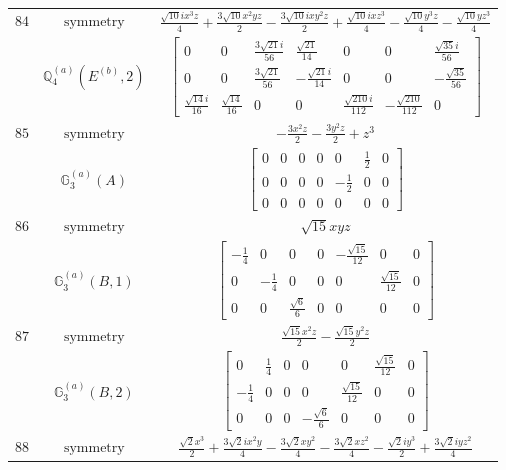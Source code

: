 \documentclass[fleqn,8pt,landscape]{jsarticle}
\begin{document}
\begin{longtable}{ccc}
$ 84 $ & $ \text{symmetry} $ & $ \frac{\sqrt{10} i x^{3} z}{4} + \frac{3 \sqrt{10} x^{2} y z}{2} - \frac{3 \sqrt{10} i x y^{2} z}{2} + \frac{\sqrt{10} i x z^{3}}{4} - \frac{\sqrt{10} y^{3} z}{4} - \frac{\sqrt{10} y z^{3}}{4} $ \\
$  $ & $ \mathbb{Q}_{4}^{(a)}(E^{(b)},2) $ & $ \begin{bmatrix} 0 & 0 & \frac{3 \sqrt{21} i}{56} & \frac{\sqrt{21}}{14} & 0 & 0 & \frac{\sqrt{35} i}{56} \\ 0 & 0 & \frac{3 \sqrt{21}}{56} & - \frac{\sqrt{21} i}{14} & 0 & 0 & - \frac{\sqrt{35}}{56} \\ \frac{\sqrt{14} i}{16} & \frac{\sqrt{14}}{16} & 0 & 0 & \frac{\sqrt{210} i}{112} & - \frac{\sqrt{210}}{112} & 0 \end{bmatrix} $ \\ \hline
$ 85 $ & $ \text{symmetry} $ & $ - \frac{3 x^{2} z}{2} - \frac{3 y^{2} z}{2} + z^{3} $ \\
$  $ & $ \mathbb{G}_{3}^{(a)}(A) $ & $ \begin{bmatrix} 0 & 0 & 0 & 0 & 0 & \frac{1}{2} & 0 \\ 0 & 0 & 0 & 0 & - \frac{1}{2} & 0 & 0 \\ 0 & 0 & 0 & 0 & 0 & 0 & 0 \end{bmatrix} $ \\ \hline
$ 86 $ & $ \text{symmetry} $ & $ \sqrt{15} x y z $ \\
$  $ & $ \mathbb{G}_{3}^{(a)}(B,1) $ & $ \begin{bmatrix} - \frac{1}{4} & 0 & 0 & 0 & - \frac{\sqrt{15}}{12} & 0 & 0 \\ 0 & - \frac{1}{4} & 0 & 0 & 0 & \frac{\sqrt{15}}{12} & 0 \\ 0 & 0 & \frac{\sqrt{6}}{6} & 0 & 0 & 0 & 0 \end{bmatrix} $ \\ \hline
$ 87 $ & $ \text{symmetry} $ & $ \frac{\sqrt{15} x^{2} z}{2} - \frac{\sqrt{15} y^{2} z}{2} $ \\
$  $ & $ \mathbb{G}_{3}^{(a)}(B,2) $ & $ \begin{bmatrix} 0 & \frac{1}{4} & 0 & 0 & 0 & \frac{\sqrt{15}}{12} & 0 \\ - \frac{1}{4} & 0 & 0 & 0 & \frac{\sqrt{15}}{12} & 0 & 0 \\ 0 & 0 & 0 & - \frac{\sqrt{6}}{6} & 0 & 0 & 0 \end{bmatrix} $ \\ \hline
$ 88 $ & $ \text{symmetry} $ & $ \frac{\sqrt{2} x^{3}}{2} + \frac{3 \sqrt{2} i x^{2} y}{4} - \frac{3 \sqrt{2} x y^{2}}{4} - \frac{3 \sqrt{2} x z^{2}}{4} - \frac{\sqrt{2} i y^{3}}{2} + \frac{3 \sqrt{2} i y z^{2}}{4} $ \\

\end{longtable}
\end{document}
